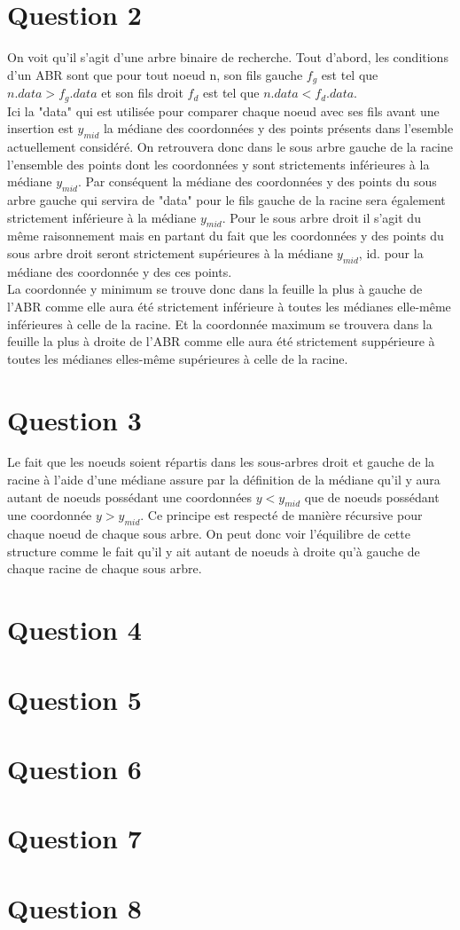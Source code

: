 \documentclass{article}
\begin{document}
\section{Question 2}
    On voit qu'il s'agit d'une arbre binaire de recherche. Tout d'abord, les conditions d'un ABR sont que pour tout noeud n, son fils gauche $f_g$ est 
    tel que $n.data > f_g.data$ et son fils droit $f_d$ est tel que $n.data < f_d.data$. \\
    Ici la "data" qui est utilisée pour comparer chaque noeud avec ses fils avant une insertion est $y_{mid}$ la médiane des coordonnées y des points
    présents dans l'esemble actuellement considéré. On retrouvera donc dans le sous arbre gauche de la racine l'ensemble des points dont les coordonnées
    y sont strictements inférieures à la médiane $y_{mid}$. Par conséquent la médiane des coordonnées y des points du sous arbre gauche qui servira
    de "data" pour le fils gauche de la racine sera également strictement inférieure à la médiane $y_{mid}$. Pour le sous arbre droit il s'agit du même raisonnement
    mais en partant du fait que les coordonnées y des points du sous arbre droit seront strictement supérieures à la médiane $y_{mid}$, id. pour la médiane des coordonnée
    y des ces points. \\
    La coordonnée y minimum se trouve donc dans la feuille la plus à gauche de l'ABR comme elle aura été strictement inférieure à toutes les médianes elle-même inférieures
    à celle de la racine. Et la coordonnée maximum se trouvera dans la feuille la plus à droite de l'ABR comme elle aura été strictement suppérieure à toutes
    les médianes elles-même supérieures à celle de la racine.

\newpage
\section{Question 3}
    Le fait que les noeuds soient répartis dans les sous-arbres droit et gauche de la racine à l'aide d'une médiane assure par la définition de
    la médiane qu'il y aura autant de noeuds possédant une coordonnées $y < y_{mid}$ que de noeuds possédant une coordonnée $y > y_{mid}$.
    Ce principe est respecté de manière récursive pour chaque noeud de chaque sous arbre. On peut donc voir l'équilibre de cette structure comme le fait
    qu'il y ait autant de noeuds à droite qu'à gauche de chaque racine de chaque sous arbre.

\section{Question 4}

\section{Question 5}

\section{Question 6}

\section{Question 7}

\section{Question 8}
\end{document}
